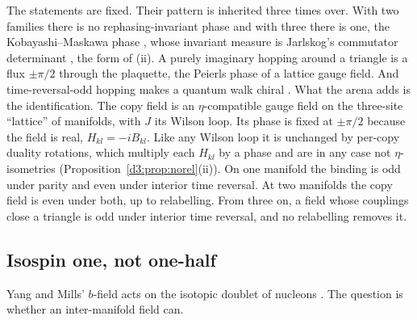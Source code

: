 The statements are fixed. Their pattern is inherited three times over. With two families there is no rephasing-invariant phase and with three
there is one, the Kobayashi--Maskawa phase \cite{KobayashiMaskawa73}, whose invariant measure is Jarlskog's commutator determinant
\cite{Jarlskog85}, the form of (ii). A purely imaginary hopping around a triangle is a flux $\pm\pi/2$ through the plaquette, the Peierls phase
\cite{Peierls33} of a lattice gauge field. And time-reversal-odd hopping makes a quantum walk chiral \cite{Zimboras13}. What the arena adds is
the identification. The copy field is an $\eta$-compatible gauge field on the three-site ``lattice'' of manifolds, with $J$ its Wilson loop. Its
phase is fixed at $\pm\pi/2$ because the field is real, $H_{kl}=-iB_{kl}$. Like any Wilson loop it is unchanged by per-copy duality rotations, which multiply each $H_{kl}$ by a phase and are in any case not $\eta$-isometries
(Proposition~\ref{d3:prop:norel}(ii)). On one manifold the binding is odd under parity and even under interior time reversal. At two manifolds the
copy field is even under both, up to relabelling. From three on, a field whose couplings close a triangle is odd under interior time reversal,
and no relabelling removes it.

\subsection{Isospin one, not one-half}
\label{d7:sec:isospin}

Yang and Mills' $b$-field acts on the isotopic doublet of nucleons \cite{YangMills54}. The question is whether an inter-manifold field can.

